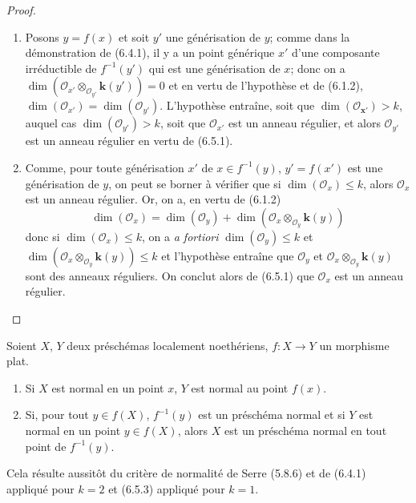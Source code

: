\begin{proof}
\medskip\noindent
\begin{enumerate}
\item[(i)] Posons $y=f(x)$ et soit $y'$ une générisation de $y$; comme
dans la démonstration de (6.4.1), il y a un point générique $x'$ d'une
composante irréductible de $f^{-1}(y')$ qui est une générisation de $x$;
donc on a
$\dim(\mathcal O_{x'}\otimes_{\mathcal O_{y'}}\boldsymbol{k}(y'))=0$
et en vertu de l'hypothèse et de (6.1.2),
$\dim(\mathcal O_{x'})=\dim(\mathcal O_{y'})$.
L'hypothèse entraîne, soit que
$\dim(\mathcal O_{\boldsymbol{x}'})>k$, auquel cas
$\dim(\mathcal O_{y'})>k$, soit que $\mathcal O_{x'}$ est un anneau
régulier, et alors $\mathcal O_{y'}$ est un anneau régulier en vertu de
(6.5.1).

\item[(ii)] Comme, pour toute générisation $x'$ de $x\in f^{-1}(y)$,
$y'=f(x')$ est une générisation de $y$, on peut se borner à vérifier que
si $\dim(\mathcal O_x)\leqslant k$, alors $\mathcal O_x$ est un anneau
régulier. Or, on a, en vertu de (6.1.2)
\[
\dim(\mathcal O_x)=\dim(\mathcal O_y)
+\dim(\mathcal O_x\otimes_{\mathcal O_y}\boldsymbol{k}(y))
\]
donc si $\dim(\mathcal O_x)\leqslant k$, on a \emph{a fortiori}
$\dim(\mathcal O_y)\leqslant k$ et
$\dim(\mathcal O_x\otimes_{\mathcal O_y}\boldsymbol{k}(y))\leqslant k$ et l'hypothèse
entraîne que $\mathcal O_y$ et
$\mathcal O_x\otimes_{\mathcal O_y}\boldsymbol{k}(y)$ sont des anneaux réguliers. On
conclut alors de (6.5.1) que $\mathcal O_x$ est un anneau régulier.
\end{enumerate}
\end{proof}

\begin{corollary}[6.5.4]
\label{IV.2.s6.5.4-fr}
Soient $X$, $Y$ deux préschémas localement noethériens, $f:X\to Y$
un morphisme plat.
\begin{enumerate}
\item[\textup{(i)}] Si $X$ est normal en un point $x$, $Y$ est normal au point
$f(x)$.
\item[\textup{(ii)}] Si, pour tout $y\in f(X)$, $f^{-1}(y)$ est un préschéma
normal et si $Y$ est normal en un point $y\in f(X)$, alors $X$ est un
préschéma normal en tout point de $f^{-1}(y)$.
\end{enumerate}
\end{corollary}

Cela résulte aussitôt du critère de normalité de Serre (5.8.6) et de
(6.4.1) appliqué pour $k=2$ et (6.5.3) appliqué pour $k=1$.

